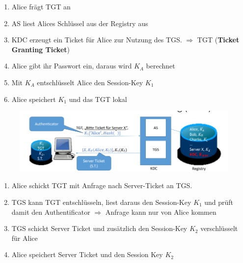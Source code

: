 \begin{enumerate}
	\item Alice frägt TGT an
	\item AS liest Alices Schlüssel aus der Registry aus
	\item KDC erzeugt ein Ticket für Alice zur Nutzung des TGS. $\Rightarrow$ TGT (\textbf{Ticket Granting Ticket})
	\item Alice gibt ihr Passwort ein, daraus wird $K_A$ berechnet
	\item Mit $K_A$ entschlüsselt Alice den Session-Key $K_1$ 
	\item Alice speichert $K_1$ und das TGT lokal
\end{enumerate}

\begin{figure}[H]
	\begin{center}
		\includegraphics[scale=0.8]{Resources/AblaufKerberos2.png}
		\caption{}
		\label{fig:AblaufKerberos2.png}
	\end{center}
\end{figure}

\begin{enumerate}
	\item Alice schickt TGT mit Anfrage nach Server-Ticket an TGS.
	\item TGS kann TGT entschlüsseln, liest daraus den Session-Key $K_1$ und prüft damit den Authentificator $\Rightarrow$ Anfrage kann nur von Alice kommen
	\item TGS schickt Server Ticket und zusätzlich den Session-Key $K_2$ verschlüsselt für Alice
	\item Alice speichert Server Ticket und den Session Key $K_2$
\end{enumerate}

